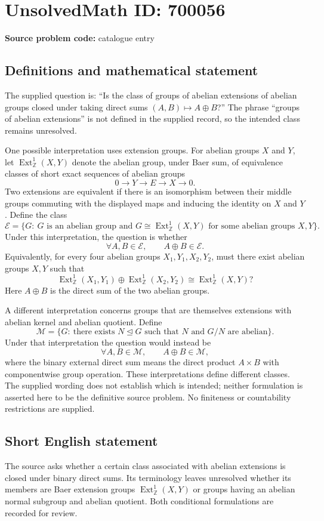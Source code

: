 \documentclass[11pt]{article}
\newcommand{\Z}{\mathbb{Z}}
\begin{document}
\section*{UnsolvedMath ID: 700056}
\textbf{Source problem code:} catalogue entry
\subsection{Definitions and mathematical statement}
The supplied question is: ``Is the class of groups of abelian extensions of abelian groups closed under taking direct sums $(A,B)\mapsto A\oplus B$?'' The phrase ``groups of abelian extensions'' is not defined in the supplied record, so the intended class remains unresolved.

One possible interpretation uses extension groups. For abelian groups $X$ and $Y$, let $\operatorname{Ext}^{1}_{\Z}(X,Y)$ denote the abelian group, under Baer sum, of equivalence classes of short exact sequences of abelian groups
\[
0\longrightarrow Y\longrightarrow E\longrightarrow X\longrightarrow 0.
\]
Two extensions are equivalent if there is an isomorphism between their middle groups commuting with the displayed maps and inducing the identity on $X$ and $Y$. Define the class
\[
\mathcal E=\{G:\ G\text{ is an abelian group and }G\cong\operatorname{Ext}^{1}_{\Z}(X,Y)\text{ for some abelian groups }X,Y\}.
\]
Under this interpretation, the question is whether
\[
\forall A,B\in\mathcal E,\qquad A\oplus B\in\mathcal E.
\]
Equivalently, for every four abelian groups $X_1,Y_1,X_2,Y_2$, must there exist abelian groups $X,Y$ such that
\[
\operatorname{Ext}^{1}_{\Z}(X_1,Y_1)\oplus\operatorname{Ext}^{1}_{\Z}(X_2,Y_2)
\cong\operatorname{Ext}^{1}_{\Z}(X,Y)?
\]
Here $A\oplus B$ is the direct sum of the two abelian groups.

A different interpretation concerns groups that are themselves extensions with abelian kernel and abelian quotient. Define
\[
\mathcal M=\{G:\ \text{there exists }N\trianglelefteq G\text{ such that }N\text{ and }G/N\text{ are abelian}\}.
\]
Under that interpretation the question would instead be
\[
\forall A,B\in\mathcal M,\qquad A\oplus B\in\mathcal M,
\]
where the binary external direct sum means the direct product $A\times B$ with componentwise group operation. These interpretations define different classes. The supplied wording does not establish which is intended; neither formulation is asserted here to be the definitive source problem. No finiteness or countability restrictions are supplied.
\subsection{Short English statement}
The source asks whether a certain class associated with abelian extensions is closed under binary direct sums. Its terminology leaves unresolved whether its members are Baer extension groups $\operatorname{Ext}^{1}_{\Z}(X,Y)$ or groups having an abelian normal subgroup and abelian quotient. Both conditional formulations are recorded for review.
\end{document}
